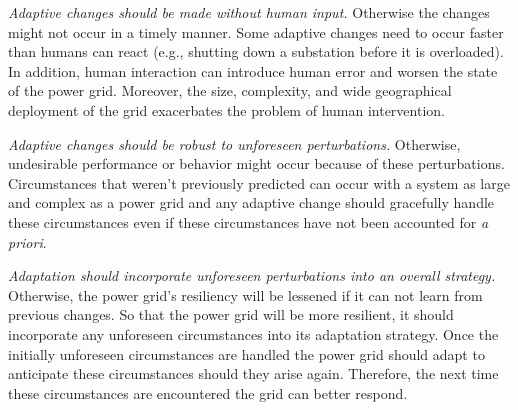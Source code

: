 \documentclass[conference]{IEEEtran}
\begin{document}
\emph{Adaptive changes should be made without human input.} Otherwise the changes might not occur in a timely manner. Some adaptive changes need to occur faster than humans can react (e.g., shutting down a substation before it is overloaded). In addition, human interaction can introduce human error and worsen the state of the power grid. Moreover, the size, complexity, and wide geographical deployment of the grid exacerbates the problem of human intervention.

\emph{Adaptive changes should be robust to unforeseen perturbations.} Otherwise, undesirable performance or behavior might occur because of these perturbations. Circumstances that weren't previously predicted can occur with a system as large and complex as a power grid and any adaptive change should gracefully handle these circumstances even if these circumstances have not been accounted for \emph{a priori}.

\emph{Adaptation should incorporate unforeseen perturbations into an overall strategy.}
Otherwise, the power grid's resiliency will be lessened if it can not learn from previous changes. So that the power grid will be more resilient, it should incorporate any unforeseen circumstances into its adaptation strategy. Once the initially unforeseen circumstances are handled the power grid should adapt to anticipate these circumstances should they arise again. Therefore, the next time these circumstances are encountered the grid can better respond.
\end{document}
